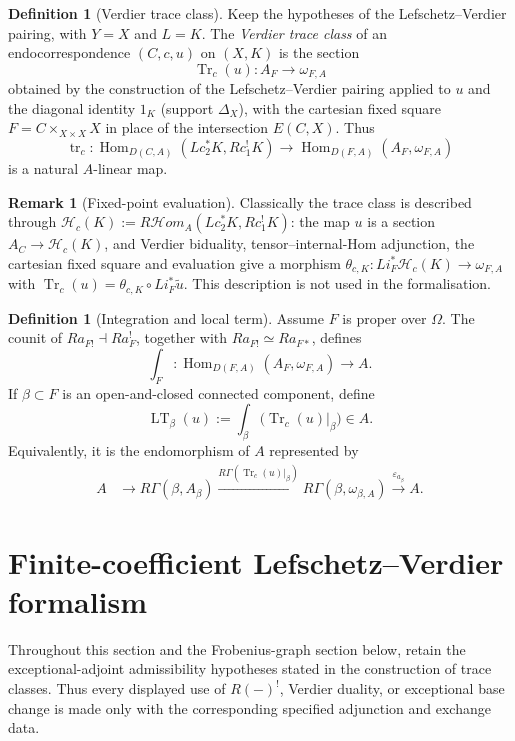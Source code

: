 \documentclass[10pt]{article}
\theoremstyle{definition}
\newtheorem{definition}[theorem]{Definition}
\newtheorem{remark}[theorem]{Remark}
\newcommand{\Hom}{\operatorname{Hom}}
\begin{document}
\begin{definition}[Verdier trace class]
Keep the hypotheses of the Lefschetz--Verdier pairing, with \(Y=X\) and
\(L=K\).  The \emph{Verdier trace class} of an endocorrespondence
\((C,c,u)\) on \((X,K)\) is the section
\[
 \operatorname{Tr}_c(u):A_F\longrightarrow\omega_{F,A}
\]
obtained by the construction of the Lefschetz--Verdier pairing applied to
\(u\) and the diagonal identity \(1_K\) (support \(\Delta_X\)), with the
cartesian fixed square \(F=C\times_{X\times X}X\) in place of the
intersection \(E(C,X)\).  Thus
\[
 \operatorname{tr}_c:
 \Hom_{D(C,A)}(Lc_2^*K,Rc_1^!K)
 \longrightarrow
 \Hom_{D(F,A)}(A_F,\omega_{F,A})
\]
is a natural \(A\)-linear map.
\end{definition}

\begin{remark}[Fixed-point evaluation]
Classically the trace class is described through
\(\mathcal H_c(K):=R\mathcal Hom_A(Lc_2^*K,Rc_1^!K)\): the map \(u\) is a
section \(A_C\to\mathcal H_c(K)\), and Verdier biduality, tensor--internal-Hom
adjunction, the cartesian fixed square and evaluation give a morphism
\(\theta_{c,K}:Li_F^*\mathcal H_c(K)\to\omega_{F,A}\) with
\(\operatorname{Tr}_c(u)=\theta_{c,K}\circ Li_F^*\widetilde u\).  This
description is not used in the formalisation.
\end{remark}

\begin{definition}[Integration and local term]
Assume \(F\) is proper over \(\Omega\).  The counit of
\(Ra_{F!}\dashv Ra_F^!\), together with \(Ra_{F!}\simeq Ra_{F*}\), defines
\[
 \int_F:
 \Hom_{D(F,A)}(A_F,\omega_{F,A})\longrightarrow A.
\]
If \(\beta\subset F\) is an open-and-closed connected component, define
\[
 \operatorname{LT}_\beta(u):=
 \int_\beta\bigl(\operatorname{Tr}_c(u)|_\beta\bigr)\in A.
\]
Equivalently, it is the endomorphism of \(A\) represented by
\[
\begin{aligned}
A&\longrightarrow R\Gamma(\beta,A_\beta)
\xrightarrow{R\Gamma(\operatorname{Tr}_c(u)|_\beta)}
R\Gamma(\beta,\omega_{\beta,A})
\xrightarrow{\varepsilon_{a_\beta}}A.
\end{aligned}
\]
\end{definition}

\section{Finite-coefficient Lefschetz--Verdier formalism}

Throughout this section and the Frobenius-graph section below, retain the
exceptional-adjoint admissibility hypotheses stated in the construction of
trace classes.  Thus every displayed use of \(R(-)^!\), Verdier duality, or
exceptional base change is made only with the corresponding specified
adjunction and exchange data.
\end{document}
